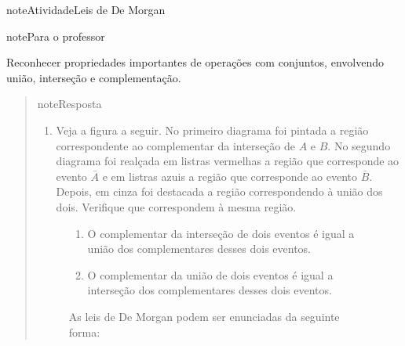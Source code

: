 \begin{sphinxadmonition}{note}{Atividade}{Leis de De Morgan}
\label{ativ-leis-de-demorgan}

\begin{sphinxadmonition}{note}{Para o professor}

  Reconhecer propriedades importantes de operações com conjuntos, envolvendo união, interseção e complementação.
\begin{quote}

\begin{sphinxadmonition}{note}{Resposta}

\begin{enumerate}
\item {} 
Veja a figura a seguir. No primeiro diagrama foi pintada a região correspondente ao complementar da interseção de \(A\) e \(B\). No segundo diagrama foi realçada em listras vermelhas a região que corresponde ao evento \(\bar{A}\) e em listras azuis a região que corresponde ao evento \(\bar{B}\). Depois, em cinza foi destacada a região correspondendo à união dos dois. Verifique que correspondem à mesma região.

\end{enumerate}
\end{sphinxadmonition}
\label{\detokenize{PE511-2:fig-coloque-aqui-o-nome}}
\begin{figure}[H]
\centering

\noindent{}
\label{\detokenize{PE511-2:fig-coloque-aqui-o-nome}}\end{figure}

\begin{figure}[H]
\centering
\capstart

\noindent{}
\caption{As leis de De Morgan podem ser enunciadas da seguinte forma:}
\begin{sphinxlegend}\begin{enumerate}
\item {} 
O complementar da interseção de dois eventos é igual a união dos complementares desses dois eventos.

\item {} 
O complementar da união de dois eventos é igual a interseção dos complementares desses dois eventos.

\end{enumerate}
\end{sphinxlegend}
\label{\detokenize{PE511-2:id1}}\label{\detokenize{PE511-2:id3}}\end{figure}
\end{quote}
\end{sphinxadmonition}


\end{sphinxadmonition}
